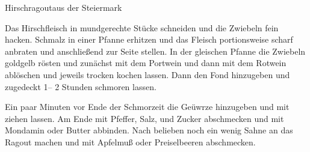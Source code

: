 \begin{recipe}{Hirschragout}{aus der Steiermark}
  \label{Hirschragout}

  \steps

  Das Hirschfleisch in mundgerechte Stücke schneiden und die Zwiebeln fein
  hacken. Schmalz in einer Pfanne erhitzen und das Fleisch portionsweise scharf
  anbraten und anschließend zur Seite stellen. In der gleischen Pfanne die
  Zwiebeln goldgelb rösten und zunächst mit dem Portwein und dann mit dem
  Rotwein ablöschen und jeweils trocken kochen lassen. Dann den Fond hinzugeben
  und zugedeckt 1\halb -- 2 Stunden schmoren lassen.

  Ein paar Minuten vor Ende der Schmorzeit die Geüwrze hinzugeben und mit
  ziehen lassen. Am Ende mit Pfeffer, Salz, und Zucker abschmecken und mit
  Mondamin oder Butter abbinden. Nach belieben noch ein wenig Sahne an das
  Ragout machen und mit Apfelmuß oder Preiselbeeren abschmecken.

\end{recipe}
